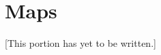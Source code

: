 \documentclass[12pt]{article}
\newcommand{\note}[1]{[This portion has yet to be written.]}
\newcounter{theorem}
\begin{document}
\section{Maps}

\note{Describe the category of sets and the theorems from the functions chapter that can be re-construed as properties of the category of sets.
Emphasize the importance of ``fixing the bug'' for the purpose of doing category theory.
Mention that there are many categories.}






\end{document}

